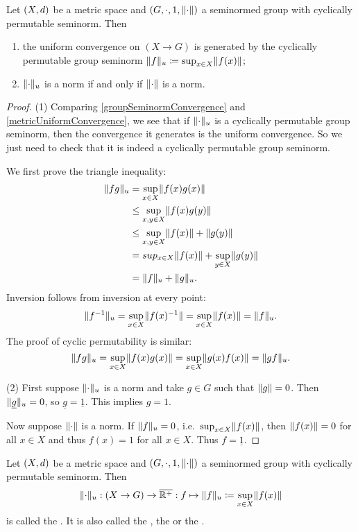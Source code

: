 \begin{lemma} \label{groupUniformNorm}
Let $\sSet{X,d}$ be a metric space and $\sSet{G,\cdot, 1,\norm{\cdot}}$ a seminormed group with cyclically permutable seminorm. Then
\begin{enumerate}
\item the uniform convergence on $(X\to G)$ is generated by the cyclically permutable group seminorm $\lVert f\rVert_{u} \coloneqq \sup_{x\in X}\lVert f(x)\rVert$;
\item $\lVert\cdot\rVert_u$ is a norm \textup{if and only if} $\lVert\cdot\rVert$ is a norm.
\end{enumerate}
\end{lemma}
\begin{proof}
(1) Comparing \ref{groupSeminormConvergence} and \ref{metricUniformConvergence}, we see that if $\lVert\cdot\rVert_u$ is a cyclically permutable group seminorm, then the convergence it generates is the uniform convergence. So we just need to check that it is indeed a cyclically permutable group seminorm.

We first prove the triangle inequality:
\begin{align*}
\lVert fg\rVert_u &= \sup_{x\in X}\lVert f(x)g(x)\rVert \\
&\leq \sup_{x,y\in X}\lVert f(x)g(y)\rVert \\
&\leq \sup_{x,y\in X}\lVert f(x)\rVert + \lVert g(y)\rVert \\
&= sup_{x\in X}\lVert f(x)\rVert + \sup_{y\in X}\lVert g(y)\rVert \\
&= \lVert f\rVert_u + \lVert g\rVert_u.
\end{align*}
Inversion follows from inversion at every point:
\[ \lVert f^{-1}\rVert_u = \sup_{x\in X}\lVert f(x)^{-1}\rVert = \sup_{x\in X}\lVert f(x)\rVert = \lVert f\rVert_u. \]
The proof of cyclic permutability is similar:
\[ \lVert fg\rVert_u = \sup_{x\in X}\lVert f(x)g(x)\rVert = \sup_{x\in X}\lVert g(x)f(x)\rVert = \lVert gf\rVert_u. \]

(2) First suppose $\lVert\cdot\rVert_u$ is a norm and take $g\in G$ such that $\lVert g\rVert= 0$. Then $\lVert\underline{g}\rVert_u = 0$, so $\underline{g} = \underline{1}$. This implies $g = 1$.

Now suppose $\lVert\cdot\rVert$ is a norm. If $\lVert f\rVert_u = 0$, i.e.\ $\sup_{x\in X}\lVert f(x)\rVert$, then $\lVert f(x)\rVert = 0$ for all $x\in X$ and thus $f(x) = 1$ for all $x\in X$. Thus $f = \underline{1}$.
\end{proof}

\begin{definition}
Let $\sSet{X,d}$ be a metric space and $\sSet{G,\cdot, 1,\norm{\cdot}}$ a seminormed group with cyclically permutable seminorm. Then
\[ \lVert\cdot\rVert_u: (X\to G) \to \overline{\mathbb{R}^+}: f\mapsto \lVert f\rVert_u \coloneqq \sup_{x\in X}\lVert f(x)\rVert \]
is called the . It is also called the , the  or the .
\end{definition}

